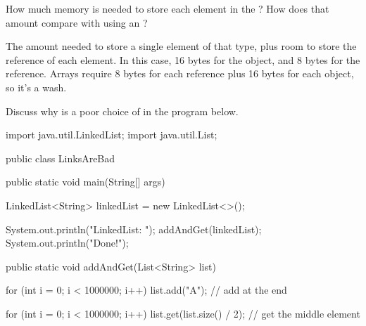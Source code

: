 \Q How much memory is needed to store each element in the ?
How does that amount compare with using an ?

\begin{answer}[5em]
The amount needed to store a single element of that type, plus room to store the  reference of each element.
In this case, 16 bytes for the  object, and 8 bytes for the  reference.
Arrays require 8 bytes for each reference plus 16 bytes for each object, so it's a wash.
\end{answer}


\Q Discuss why  is a poor choice of  in the program below.

\begin{javabox}
import java.util.LinkedList;
import java.util.List;

public class LinksAreBad
{
    public static void main(String[] args)
    {
        LinkedList<String> linkedList = new LinkedList<>();

        System.out.println("LinkedList: ");
        addAndGet(linkedList);
        System.out.println("Done!");
    }

    public static void addAndGet(List<String> list)
    {
        for (int i = 0; i < 1000000; i++)
        {
            list.add("A");  // add at the end
        }

        for (int i = 0; i < 1000000; i++)
        {
            list.get(list.size() / 2);  // get the middle element
        }
    }
}
\end{javabox}
